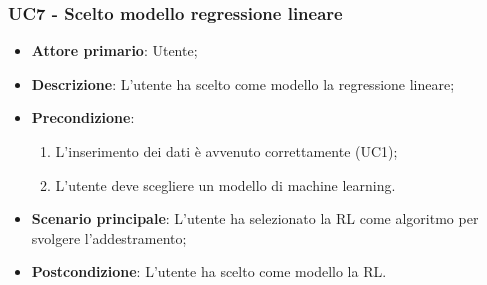 \subsubsection{UC7 - Scelto modello regressione lineare}%
\label{sssec:uc7}
\begin{itemize}
  \item \textbf{Attore primario}: Utente;
  \item \textbf{Descrizione}: L'utente ha scelto come modello la regressione lineare;
  \item \textbf{Precondizione}:
  \begin{enumerate}
    \item L'inserimento dei dati è avvenuto correttamente (UC1);
    \item L'utente deve scegliere un modello di machine learning.
  \end{enumerate}
  \item \textbf{Scenario principale}: L'utente ha selezionato la RL come algoritmo per svolgere l'addestramento;
  \item \textbf{Postcondizione}: L'utente ha scelto come modello la RL.
\end{itemize}
